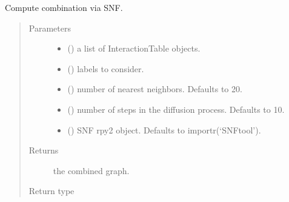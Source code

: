 \documentclass[letterpaper,10pt,english]{sphinxmanual}
\begin{document}

\begin{fulllineitems}
\label{\detokenize{_modules/cosifer.combiners:cosifer.combiners.snf.compute_snf}}
Compute combination via SNF.
\begin{quote}\begin{description}
\item[{Parameters}] \leavevmode\begin{itemize}
\item {} 
 () \textendash{} a list of InteractionTable objects.

\item {} 
 () \textendash{} labels to consider.

\item {} 
 (\sphinxstyleliteralemphasis{\sphinxupquote{, }}) \textendash{} number of nearest neighbors. Defaults to 20.

\item {} 
 (\sphinxstyleliteralemphasis{\sphinxupquote{, }}) \textendash{} number of steps in the diffusion process. Defaults
to 10.

\item {} 
 (\sphinxstyleliteralemphasis{\sphinxupquote{, }}) \textendash{} SNF rpy2 object. Defaults to
importr(‘SNFtool’).

\end{itemize}

\item[{Returns}] \leavevmode
the combined graph.

\item[{Return type}] \leavevmode
{\hyperref[\detokenize{_modules/cosifer.collections:cosifer.collections.graph.Graph}]{}}

\end{description}\end{quote}

\end{fulllineitems}
\end{document}
